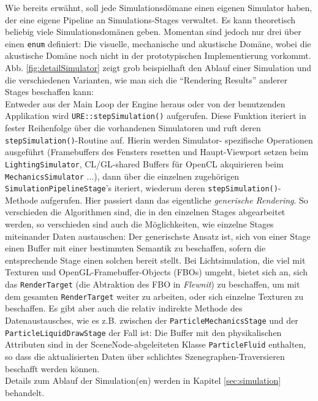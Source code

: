 	Wie bereits erwähnt, soll jede Simulationsdömane einen eigenen Simulator haben, 
	der eine eigene Pipeline an Simulations-Stages verwaltet.
	Es kann theoretisch beliebig viele Simulationsdomänen geben. Momentan sind jedoch nur drei
	über einen \lstinline|enum| definiert: Die visuelle, mechanische und akustische Domäne, wobei
	die akustische Domäne noch nicht in der prototypischen Implementierung vorkommt.
	Abb. \ref{fig:detailSimulator} zeigt grob beispielhaft den Ablauf einer Simulation und die verschiedenen
	Varianten, wie man sich die "`Rendering Results"' anderer Stages beschaffen kann:\\
	Entweder aus der Main Loop der Engine heraus oder von der benutzenden Applikation wird
	\lstinline|URE::stepSimulation()| aufgerufen. Diese Funktion iteriert in fester Reihenfolge über die
	vorhandenen Simulatoren und ruft deren \lstinline|stepSimulation()|-Routine auf. Hierin werden Simulator-
	spezifische Operationen ausgeführt (Framebuffers des Fensters resetten und Haupt-Viewport setzen beim 
	\lstinline|LightingSimulator|, CL/GL-shared Buffers für OpenCL akquirieren beim \lstinline|MechanicsSimulator| ...),
	dann über die einzelnen zugehörigen	\lstinline|SimulationPipelineStage|'s iteriert, wiederum deren 
	\lstinline|stepSimulation()|-Methode aufgerufen.
	Hier passiert dann das eigentliche \emph{generische Rendering}.
	So verschieden die Algorithmen sind, die in den einzelnen Stages abgearbeitet werden, so verschieden sind auch
	die Möglichkeiten, wie einzelne Stages miteinander Daten austauschen: Der generischste Ansatz ist, sich von einer
	Stage einen Buffer mit einer bestimmten Semantik zu beschaffen, sofern die entsprechende Stage einen solchen
	bereit stellt. Bei Lichtsimulation, die viel mit Texturen und OpenGL-Framebuffer-Objects (FBOs) umgeht,
	bietet sich an, sich das \lstinline|RenderTarget| (die Abtraktion des FBO in \emph{Flewnit}) zu beschaffen,
	um mit dem gesamten \lstinline|RenderTarget| weiter zu arbeiten, oder sich einzelne Texturen zu beschaffen.
	Es gibt aber auch die relativ indirekte Methode des Datenaustausches, wie es z.B. zwischen der 
	\lstinline|ParticleMechanicsStage| und der \lstinline|ParticleLiquidDrawStage| der Fall ist: Die Buffer mit den 		
	physikalischen Attributen sind in der SceneNode-abgeleiteten
	Klasse \lstinline|ParticleFluid| enthalten, so dass die aktualisierten Daten über schlichtes Szenegraphen-Traversieren
	beschafft werden können.\\
	Details zum Ablauf der Simulation(en) werden in Kapitel \ref{sec:simulation} behandelt.




